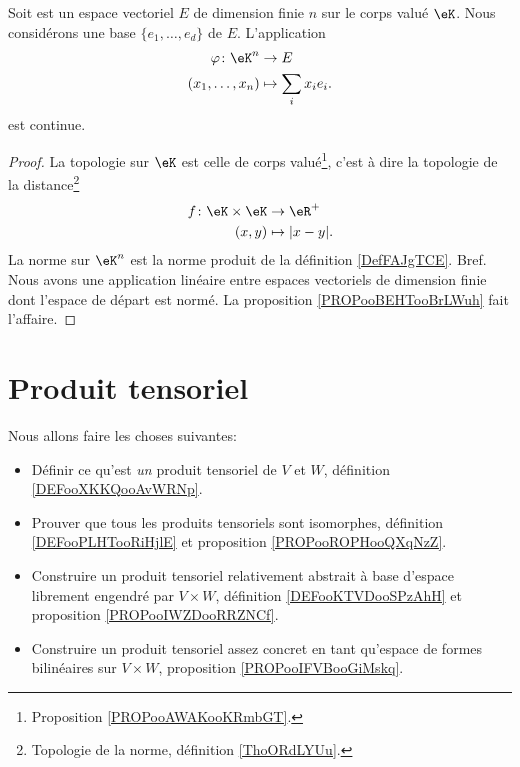\begin{proposition}	\label{PROPooYCDLooPukiId}
	Soit est un espace vectoriel \( E\) de dimension finie \( n\) sur le corps valué \( \eK\). Nous considérons une base \( \{ e_1,\ldots,e_d \}\) de \( E\). L'application
	\begin{equation}
		\begin{aligned}
			\varphi\colon \eK^n & \to E                 \\
			(x_1,\ldots,x_n)    & \mapsto \sum_ix_ie_i.
		\end{aligned}
	\end{equation}
	est continue.
\end{proposition}

\begin{proof}
	La topologie sur \( \eK\) est celle de corps valué\footnote{Proposition \ref{PROPooAWAKooKRmbGT}.}, c'est à dire la topologie de la distance\footnote{Topologie de la norme, définition \ref{ThoORdLYUu}.}
	\begin{equation}
		\begin{aligned}
			f\colon \eK\times \eK & \to \eR^+        \\
			(x,y)                 & \mapsto | x-y |.
		\end{aligned}
	\end{equation}
	La norme sur \( \eK^n\) est la norme produit de la définition \ref{DefFAJgTCE}. Bref. Nous avons une application linéaire entre espaces vectoriels de dimension finie dont l'espace de départ est normé. La proposition \ref{PROPooBEHTooBrLWuh} fait l'affaire.
\end{proof}

\section{Produit tensoriel}

Nous allons faire les choses suivantes:
\begin{itemize}
	\item
	      Définir ce qu'est \emph{un} produit tensoriel de \( V\) et \( W\), définition \ref{DEFooXKKQooAvWRNp}.
	\item
	      Prouver que tous les produits tensoriels sont isomorphes, définition \ref{DEFooPLHTooRiHjlE} et proposition \ref{PROPooROPHooQXqNzZ}.
	\item
	      Construire un produit tensoriel relativement abstrait à base d'espace librement engendré par \( V\times W\), définition \ref{DEFooKTVDooSPzAhH} et proposition \ref{PROPooIWZDooRRZNCf}.
	\item
	      Construire un produit tensoriel assez concret en tant qu'espace de formes bilinéaires sur \( V\times W\), proposition \ref{PROPooIFVBooGiMskq}.
\end{itemize}

